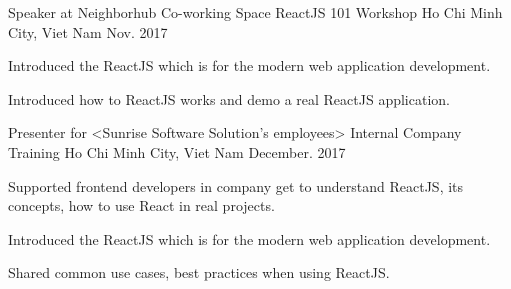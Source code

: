 

\begin{cventries}

  \cventry
    {Speaker at Neighborhub Co-working Space} %
    {ReactJS 101 Workshop} %
    {Ho Chi Minh City, Viet Nam} %
    {Nov. 2017} %
    {
      \begin{cvitems} %
        \item {Introduced the ReactJS which is for the modern web application development.}
        \item {Introduced how to ReactJS works and demo a real ReactJS application.}
      \end{cvitems}
    }

  \cventry
    {Presenter for <Sunrise Software Solution's employees>} %
    {Internal Company Training} %
    {Ho Chi Minh City, Viet Nam} %
    {December. 2017} %
    {
      \begin{cvitems} %
        \item {Supported frontend developers in company get to understand ReactJS, its concepts, how to use React in real projects.}
        \item {Introduced the ReactJS which is for the modern web application development.}
        \item {Shared common use cases, best practices when using ReactJS.}
      \end{cvitems}
    }

\end{cventries}
